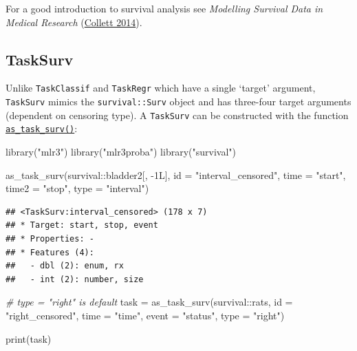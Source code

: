\documentclass[
]{scrbook}
\newenvironment{Shaded}{\begin{snugshade}}{\end{snugshade}}
\newcommand{\AttributeTok}[1]{\textcolor[rgb]{0.77,0.63,0.00}{#1}}
\newcommand{\CommentTok}[1]{\textcolor[rgb]{0.56,0.35,0.01}{\textit{#1}}}
\newcommand{\FunctionTok}[1]{\textcolor[rgb]{0.00,0.00,0.00}{#1}}
\newcommand{\NormalTok}[1]{#1}
\newcommand{\OtherTok}[1]{\textcolor[rgb]{0.56,0.35,0.01}{#1}}
\newcommand{\SpecialCharTok}[1]{\textcolor[rgb]{0.00,0.00,0.00}{#1}}
\newcommand{\StringTok}[1]{\textcolor[rgb]{0.31,0.60,0.02}{#1}}
\renewenvironment{Shaded} {\begin{snugshade}\small} {\end{snugshade}}
\begin{document}
For a good introduction to survival analysis see \emph{Modelling Survival Data in Medical Research} (\protect\hyperlink{ref-Collett2014}{Collett 2014}).

\hypertarget{tasksurv}{%
\subsection{TaskSurv}\label{tasksurv}}

Unlike \texttt{TaskClassif} and \texttt{TaskRegr} which have a single `target' argument, \texttt{TaskSurv} mimics the
\texttt{survival::Surv} object and has three-four target arguments (dependent on censoring type).
A \texttt{TaskSurv} can be constructed with the function \href{https://mlr3proba.mlr-org.com/reference/as_task_surv.html}{\texttt{as\_task\_surv()}}:

\begin{Shaded}
\begin{Highlighting}[]
\FunctionTok{library}\NormalTok{(}\StringTok{"mlr3"}\NormalTok{)}
\FunctionTok{library}\NormalTok{(}\StringTok{"mlr3proba"}\NormalTok{)}
\FunctionTok{library}\NormalTok{(}\StringTok{"survival"}\NormalTok{)}

\FunctionTok{as\_task\_surv}\NormalTok{(survival}\SpecialCharTok{::}\NormalTok{bladder2[, }\SpecialCharTok{{-}}\NormalTok{1L], }\AttributeTok{id =} \StringTok{"interval\_censored"}\NormalTok{,}
  \AttributeTok{time =} \StringTok{"start"}\NormalTok{, }\AttributeTok{time2 =} \StringTok{"stop"}\NormalTok{, }\AttributeTok{type =} \StringTok{"interval"}\NormalTok{)}
\end{Highlighting}
\end{Shaded}

\begin{verbatim}
## <TaskSurv:interval_censored> (178 x 7)
## * Target: start, stop, event
## * Properties: -
## * Features (4):
##   - dbl (2): enum, rx
##   - int (2): number, size
\end{verbatim}

\begin{Shaded}
\begin{Highlighting}[]
\CommentTok{\# type = "right" is default}
\NormalTok{task }\OtherTok{=} \FunctionTok{as\_task\_surv}\NormalTok{(survival}\SpecialCharTok{::}\NormalTok{rats, }\AttributeTok{id =} \StringTok{"right\_censored"}\NormalTok{,}
  \AttributeTok{time =} \StringTok{"time"}\NormalTok{, }\AttributeTok{event =} \StringTok{"status"}\NormalTok{, }\AttributeTok{type =} \StringTok{"right"}\NormalTok{)}

\FunctionTok{print}\NormalTok{(task)}
\end{Highlighting}
\end{Shaded}
\end{document}
